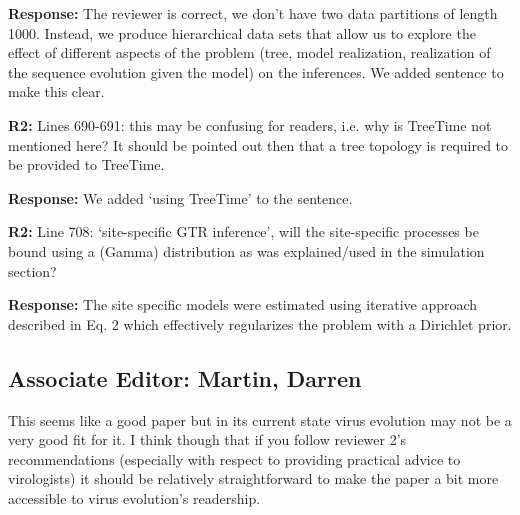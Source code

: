 \documentclass[aps,rmp,onecolumn]{revtex4-1}
\newcommand{\refb}[1]{\textbf{R2:} #1}
\newcommand{\response}[1]{{\color{black}\textbf{Response:} #1}}
\begin{document}
\response{The reviewer is correct, we don't have two data partitions of length 1000.
Instead, we produce hierarchical data sets that allow us to explore the effect of different aspects of the problem (tree, model realization, realization of the sequence evolution given the model) on the inferences.
We added sentence to make this clear. }


\refb{Lines 690-691: this may be confusing for readers, i.e. why is TreeTime not mentioned here? It should be pointed out then that a tree topology is required to be provided to TreeTime.}

\response{We added `using TreeTime' to the sentence.}

\refb{Line 708: ‘site-specific GTR inference’, will the site-specific processes be bound using a (Gamma) distribution as was explained/used in the simulation section?}

\response{The site specific models were estimated using iterative approach described in Eq. 2 which effectively regularizes the problem with a Dirichlet prior. }

\subsection*{Associate Editor: Martin, Darren}

This seems like a good paper but in its current state virus evolution may not be a very good fit for it.  I think though that if you follow reviewer 2's recommendations (especially with respect to providing practical advice to virologists) it should be relatively straightforward to make the paper a bit more accessible to virus evolution's readership.
\end{document}
